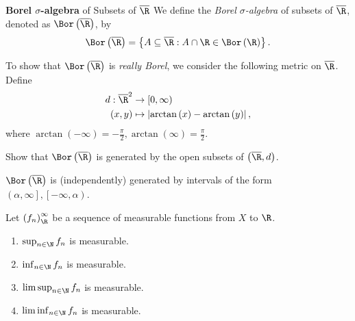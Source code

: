 \documentclass[pmath451]{subfiles}
\begin{document}
    \begin{definition}{\textbf{Borel $\sigma$-algebra} of Subsets of $\overline{\R}$}
        We define the \emph{Borel $\sigma$-algebra} of subsets of $\overline{\R}$, denoted as $\Bor\left( \overline{\R} \right)$, by
        \begin{equation*}
            \Bor\left( \overline{\R} \right) = \left\lbrace A\subseteq\overline{\R}:A\cap\R\in\Bor\left( \R \right) \right\rbrace.
        \end{equation*}
    \end{definition}

    \np To show that $\Bor\left( \overline{\R} \right)$ is \textit{really Borel}, we consider the following metric on $\overline{\R}$. Define
    \begin{equation*}
        \begin{aligned}
            d:\overline{\R}^{2}&\to\left[ 0,\infty \right) \\
            \left( x,y \right) & \mapsto \left| \arctan\left( x \right)-\arctan\left( y \right) \right|,
        \end{aligned} 
    \end{equation*}
    where $\arctan\left( -\infty \right)=-\frac{\pi}{2}, \arctan\left( \infty \right)=\frac{\pi}{2}$.

    \begin{exercise}{}
        Show that $\Bor\left( \overline{\R} \right)$ is generated by the open subsets of $\left( \overline{\R},d \right)$.
    \end{exercise}

    \rruleline

    \np $\Bor\left( \overline{\R} \right)$ is (independently) generated by intervals of the form $\left( \alpha,\infty \right], \left[ -\infty,\alpha \right)$.

    \begin{prop}{}
        Let $\left( f_{n} \right)^{\infty}_{\R}$ be a sequence of measurable functions from $X$ to $\R$.
        \begin{enumerate}
            \item $\sup_{n\in\N}f_n$ is measurable.
            \item $\inf_{n\in\N}f_n$ is measurable.
            \item $\limsup_{n\in\N}f_n$ is measurable.
            \item $\liminf_{n\in\N}f_n$ is measurable.
        \end{enumerate}
    \end{prop}
\end{document}
